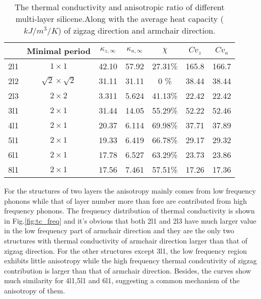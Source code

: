 \documentclass[%
 reprint,
 amsmath,amssymb,
 aps,
 prb,
]{revtex4-1}
\begin{document}
\begin{table*}
  \caption{\label{tab:table1}
    The thermal conductivity and anisotropic ratio of different multi-layer silicene.Along with the average heat capacity ($kJ/m^3/K$) of zigzag direction and armchair direction.}
  \begin{ruledtabular}
    \begin{tabular}{ccccccc}
          & Minimal period
          & $\kappa_{z,\infty}$
          & $\kappa_{a,\infty}$
          & $\chi$
          & $Cv_{z}$
          & $Cv_{a}$                                                           \\
      \hline
      2l1 & $1 \times 1$             & 42.10 & 57.92 & 27.31\% & 165.8 & 166.7 \\
      2l2 & $\sqrt{2}\times\sqrt{2}$ & 31.11 & 31.11 & 0    \% & 38.44 & 38.44 \\
      2l3 & $2 \times 2$             & 3.311 & 5.624 & 41.13\% & 22.42 & 22.42 \\
      3l1 & $2 \times 1$             & 31.44 & 14.05 & 55.29\% & 52.22 & 52.46 \\
      4l1 & $2 \times 1$             & 20.37 & 6.114 & 69.98\% & 37.71 & 37.89 \\
      5l1 & $2 \times 1$             & 19.33 & 6.419 & 66.78\% & 29.17 & 29.32 \\
      6l1 & $2 \times 1$             & 17.78 & 6.527 & 63.29\% & 23.73 & 23.86 \\
      8l1 & $2 \times 1$             & 17.56 & 7.461 & 57.51\% & 17.26 & 17.36 \\
    \end{tabular}
  \end{ruledtabular}
\end{table*}

For the structures of two layers the anisotropy mainly comes from low frequency phonons while that of layer number more than fore are contributed from high frequency phonons. The frequency distribution of thermal conductivity is shown in Fig.\ref{fig:tc_freq} and it's obvious that both 2l1 and 2l3 have much larger value in the low frequency part of armchair direction and they are the only two structures with thermal conductivity of armchair direction larger than that of zigzag direction. For the other structures except 3l1, the low frequency region exhibits little anisotropy while the high frequency thermal condcutivity of zigzag contribution is larger than that of armchair direction. Besides, the curves show much similarity for 4l1,5l1 and 6l1, suggesting a common mechanism of the anisotropy of them.
\end{document}
